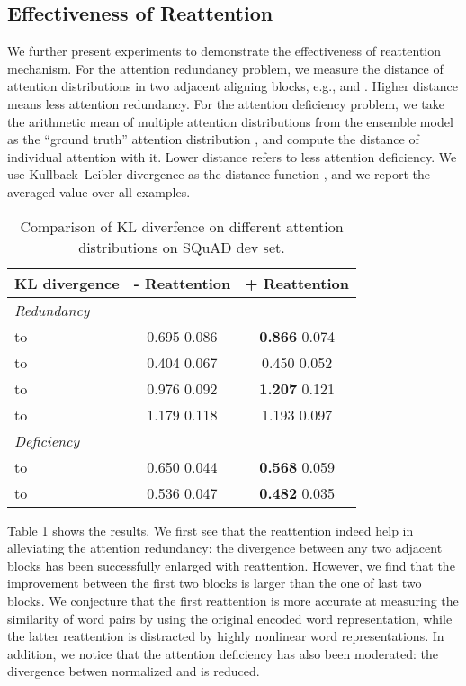 \documentclass{article}
\begin{document}
\subsection{Effectiveness of Reattention}
We further present experiments to demonstrate the effectiveness of reattention mechanism. For the attention redundancy problem, we measure the distance of attention distributions in two adjacent aligning blocks, e.g.,  and . Higher distance means less attention redundancy. For the attention deficiency problem, we take the arithmetic mean of multiple attention distributions from the ensemble model as the ``ground truth'' attention distribution , and compute the distance of individual attention  with it. Lower distance refers to less attention deficiency. We use Kullback–Leibler divergence as the distance function , and we report the averaged value over all examples.

\begin{table}
\begin{center}
\begin{tabular}{lcc}
\hline 
\textbf{KL divergence} & \bf - Reattention & \bf + Reattention \\ 
\hline
\emph{Redundancy} &  & \\ 
 to  & 0.695  0.086 & \textbf{0.866}  0.074 \\
 to  & 0.404  0.067 & 0.450  0.052 \\
 to  & 0.976  0.092 & \textbf{1.207}  0.121 \\
 to  & 1.179  0.118 & 1.193  0.097 \\
\hline
\emph{Deficiency} &  & \\ 
 to  & 0.650  0.044 & \textbf{0.568}  0.059 \\
 to  & 0.536  0.047 & \textbf{0.482}  0.035\\
\hline
\end{tabular}
\end{center}
\caption{\label{table7} Comparison of KL diverfence on different attention distributions on SQuAD dev set.}
\end{table}

Table \ref{table7} shows the results. We first see that the reattention indeed help in alleviating the attention redundancy: the divergence between any two adjacent blocks has been successfully enlarged with reattention. However, we find that the improvement between the first two blocks is larger than the one of last two blocks. We conjecture that the first reattention is more accurate at measuring the similarity of word pairs by using the  original encoded word representation, while the latter reattention is distracted by highly nonlinear word representations. In addition, we notice that the attention deficiency has also been moderated: the divergence betwen normalized  and  is reduced.
\end{document}
